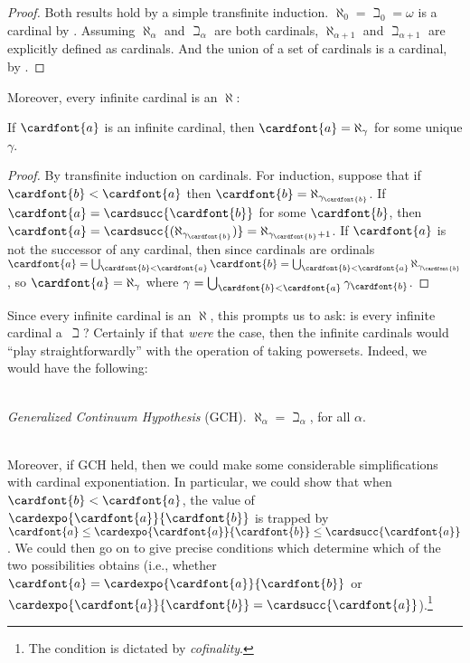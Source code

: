 \documentclass[../../../include/open-logic-section]{subfiles}
\begin{document}
\begin{proof}
Both results hold by a simple transfinite induction. $\aleph_0 =
\beth_0 = \omega$ is a cardinal by
. Assuming $\aleph_\alpha$ and
$\beth_\alpha$ are both cardinals, $\aleph_{\alpha+1}$ and
$\beth_{\alpha+1}$ are explicitly defined as cardinals. And the union
of a set of cardinals is a cardinal, by
.
\end{proof}
\noindent
Moreover, every infinite cardinal is an $\aleph$:

\begin{prop}
If $\cardfont{a}$ is an infinite cardinal, then $\cardfont{a} =
\aleph_\gamma$ for some unique $\gamma$.
\end{prop}

\begin{proof}
By transfinite induction on cardinals. For induction, suppose that if
$\cardfont{b} < \cardfont{a}$ then $\cardfont{b} =
\aleph_{\gamma_\cardfont{b}}$. If $\cardfont{a} =
\cardsucc{\cardfont{b}}$ for some $\cardfont{b}$, then $\cardfont{a} =
\cardsucc{(\aleph_{\gamma_\cardfont{b}})}=
\aleph_{\gamma_\cardfont{b}+1}$. If $\cardfont{a}$ is not the
successor of any cardinal, then since cardinals are ordinals
$\cardfont{a} = \bigcup_{\cardfont{b} < \cardfont{a}} \cardfont{b} =
\bigcup_{\cardfont{b} < \cardfont{a}}{\aleph_{\gamma_\cardfont{b}}}$,
so $\cardfont{a} = \aleph_\gamma$ where $\gamma =
\bigcup_{\cardfont{b} < \cardfont{a}}\gamma_\cardfont{b}$. 
\end{proof}

Since every infinite cardinal is an $\aleph$, this prompts us to ask:
is every infinite cardinal a~$\beth$? Certainly if that \emph{were}
the case, then the infinite cardinals would ``play straightforwardly''
with the operation of taking powersets. Indeed, we would have the
following:

\
\\\emph{Generalized Continuum Hypothesis} (GCH). $\aleph_\alpha  = \beth_\alpha$, for all $\alpha$. 

\
\\Moreover, if GCH held, then we could make some considerable
simplifications with cardinal exponentiation. In particular, we could
show that when $\cardfont{b} < \cardfont{a}$, the value of
$\cardexpo{\cardfont{a}}{\cardfont{b}}$ is trapped by
$\cardfont{a}\leq \cardexpo{\cardfont{a}}{\cardfont{b}} \leq
\cardsucc{\cardfont{a}}$. We could then go on to give precise
conditions which determine which of the two possibilities obtains
(i.e., whether $\cardfont{a} = \cardexpo{\cardfont{a}}{\cardfont{b}}$
or $\cardexpo{\cardfont{a}}{\cardfont{b}} =
\cardsucc{\cardfont{a}}$).\footnote{The condition is dictated by
\emph{cofinality}.}
\end{document}

